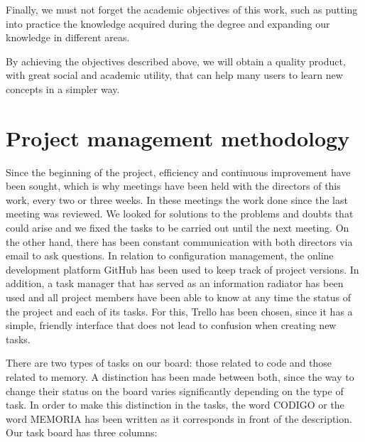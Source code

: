 Finally, we must not forget the academic objectives of this work, such as putting into practice the knowledge acquired during the degree and expanding our knowledge in different areas.

By achieving the objectives described above, we will obtain a quality product, with great social and academic utility, that can help many users to learn new concepts in a simpler way.


\section{Project management methodology}
\label{sec:project_management}

Since the beginning of the project, efficiency and continuous improvement have been sought, which is why meetings have been held with the directors of this work, every two or three weeks. In these meetings the work done since the last meeting was reviewed. We looked for solutions to the problems and doubts that could arise and we fixed the tasks to be carried out until the next meeting. On the other hand, there has been constant communication with both directors via email to ask questions.
In relation to configuration management, the online development platform GitHub has been used to keep track of project versions. In addition, a task manager that has served as an information radiator has been used and all project members have been able to know at any time the status of the project and each of its tasks. For this, Trello has been chosen, since it has a simple, friendly interface that does not lead to confusion when creating new tasks.


There are two types of tasks on our board: those related to code and those related to memory. A distinction has been made between both, since the way to change their status on the board varies significantly depending on the type of task. In order to make this distinction in the tasks, the word CODIGO or the word MEMORIA has been written as it corresponds in front of the description. Our task board has three columns:

